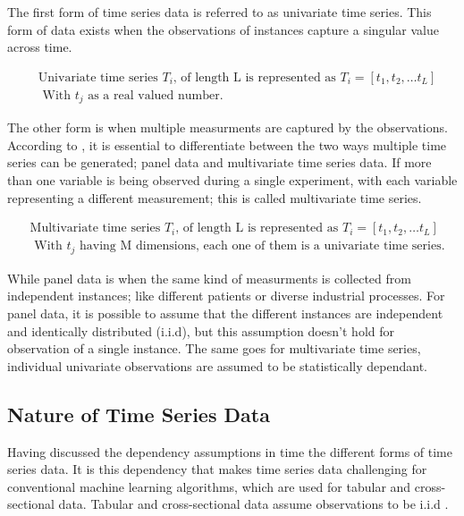 The first form of time series data is referred to as univariate time series.
This form of data exists when the observations of instances capture a singular value across time.
\begin{definition}
    \begin{align*} 
        & \text{Univariate time series } T_{i} \text{, of length L is represented as } T_{i} = [t_{1},t_{2}, \ldots t_{L}] \\
        & \text{ With } t_{j} \text{ as a real valued number.}
    \end{align*}
\end{definition}

The other form is when multiple measurments are captured by the observations.
According to \cite{loning2019sktime}, it is essential to differentiate between the two ways multiple time series can be generated; panel data and multivariate time series data.
If more than one variable is being observed during a single experiment, with each variable representing a different measurement; this is called multivariate time series.
\begin{definition}
    \begin{align*} 
        & \text{Multivariate time series } T_{i} \text{, of length L is represented as } T_{i} = [t_{1},t_{2}, \ldots t_{L}] \\
        & \text{ With } t_{j} \text{  having M dimensions, each one of them is a univariate time series.}
    \end{align*}
\end{definition}
While panel data is when the same kind of measurments is collected from independent instances; like different patients or diverse industrial processes.
For panel data, it is possible to assume that the different instances are independent and identically distributed (i.i.d), but this assumption doesn't hold for observation of a single instance.
The same goes for multivariate time series, individual univariate observations are assumed to be statistically dependant.

\subsection{Nature of Time Series Data}
\label{NatureOfTimeSeriesData}
Having discussed the dependency assumptions in time the different forms of time series data.
It is this dependency that makes time series data challenging for conventional machine learning algorithms, which are used for tabular and cross-sectional data.
Tabular and cross-sectional data assume observations to be i.i.d \cite{loning2019sktime}.

